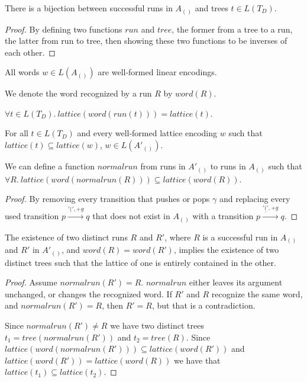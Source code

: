 \documentclass[acmsmall,review,anonymous]{acmart}\settopmatter{printfolios=true,printccs=false,printacmref=false}
\newcommand{\alt}{\mathit{alt}} %
\newcommand{\altset}{\mathit{altset}} %
\newcommand{\lattice}{\mathit{lattice}} %
\newcommand{\reqpl}{\underline{(}}
\newcommand{\pospl}{(}
\newcommand{\pospr}{)}
\newcommand{\posp}[1]{\pospl#1\pospr}
\newcommand{\treetorun}{\mathit{run}}
\newcommand{\runtotree}{\mathit{tree}}
\newcommand{\runtoword}{\mathit{word}}
\newcommand{\runprimetorun}{\mathit{normalrun}}
\begin{document}
\begin{lemma}
  There is a bijection between successful runs in $A_{\posp{}}$ and trees $t \in L(T_D)$.
\end{lemma}

\begin{proof}
  By defining two functions $\treetorun$ and $\runtotree$, the former from a tree to a run, the latter from run to tree, then showing these two functions to be inverses of each other.
\end{proof}

\begin{lemma}
  All words $w \in L(A_{\posp{}})$ are well-formed linear encodings.
\end{lemma}

We denote the word recognized by a run $R$ by $\runtoword(R)$.

\begin{lemma}
  $\forall t \in L(T_D).\ \lattice(\runtoword(\treetorun(t))) = \lattice(t)$.
\end{lemma}

\begin{lemma}
  For all $t \in L(T_D)$ and every well-formed lattice encoding $w$ such that $\lattice(t) \subseteq \lattice(w)$, $w \in L(A'_{\posp{}})$.
\end{lemma}

\begin{lemma}
  We can define a function $\runprimetorun$ from runs in $A'_{\posp{}}$ to runs in $A_{\posp{}}$ such that $\forall R.\ \lattice(\runtoword(\runprimetorun(R))) \subseteq \lattice(\runtoword(R))$.
\end{lemma}

\begin{proof}
  By removing every transition that pushes or pops $\gamma$ and replacing every used transition $p \xrightarrow{'\pospl', +g} q$ that does not exist in $A_{\posp{}}$ with a transition $p \xrightarrow{'\reqpl', +g} q$.
\end{proof}

\begin{theorem}
  The existence of two distinct runs $R$ and $R'$, where $R$ is a successful run in $A_{\posp{}}$ and $R'$ in $A'_{\posp{}}$, and $\runtoword(R) = \runtoword(R')$, implies the existence of two distinct trees such that the lattice of one is entirely contained in the other.
\end{theorem}

\begin{proof}
  Assume $\runprimetorun(R') = R$. $\runprimetorun$ either leaves its argument unchanged, or changes the recognized word. If $R'$ and $R$ recognize the same word, and $\runprimetorun(R') = R$, then $R' = R$, but that is a contradiction.

  Since $\runprimetorun(R') \neq R$ we have two distinct trees $t_1 = \runtotree(\runprimetorun(R'))$ and $t_2 = \runtotree(R)$. Since $\lattice(\runtoword(\runprimetorun(R'))) \subseteq \lattice(\runtoword(R'))$ and $\lattice(\runtoword(R')) = \lattice(\runtoword(R))$ we have that $\lattice(t_1) \subseteq \lattice(t_2)$.
\end{proof}
\end{document}
